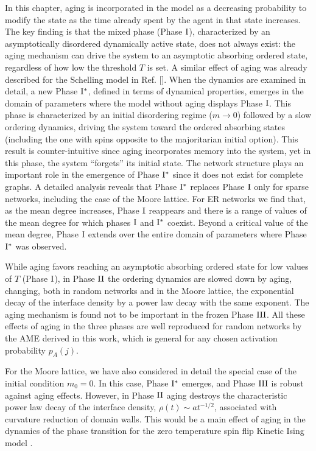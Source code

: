 In this chapter, aging is incorporated in the model as a decreasing probability to modify the state as the time already spent by the agent in that state increases. The key finding is that the mixed phase (Phase ${\rm I}$), characterized by an asymptotically disordered dynamically active state, does not always exist: the aging mechanism can drive the system to an asymptotic absorbing ordered state, regardless of how low the threshold $T$ is set. A similar effect of aging was already described for the Schelling model in Ref. []. When the dynamics are examined in detail, a new Phase ${\rm I}^{*}$, defined in terms of dynamical properties, emerges in the domain of parameters where the model without aging displays Phase ${\rm I}$. This phase is characterized by an initial disordering regime ($m \to 0$) followed by a slow ordering dynamics, driving the system toward the ordered absorbing states (including the one with spins opposite to the majoritarian initial option). This result is counter-intuitive since aging incorporates memory into the system, yet in this phase, the system ``forgets'' its initial state. The network structure plays an important role in the emergence of Phase ${\rm I}^{*}$ since it does not exist for complete graphs. A detailed analysis reveals that Phase ${\rm I}^{*}$ replaces Phase ${\rm I}$ only for sparse networks, including the case of the Moore lattice. For ER networks we find that, as the mean degree increases, Phase ${\rm I}$ reappears and there is a range of values of the mean degree for which phases ${\rm I}$ and ${\rm I}^{*}$ coexist. Beyond a critical value of the mean degree, Phase ${\rm I}$ extends over the entire domain of parameters where Phase ${\rm I}^{*}$ was observed.

While aging favors reaching an asymptotic absorbing ordered state for low values of $T$ (Phase ${\rm I}$), in Phase ${\rm II}$ the ordering dynamics are slowed down by aging, changing, both in random networks and in the Moore lattice, the exponential decay of the interface density by a power law decay with the same exponent. The aging mechanism is found not to be important in the frozen Phase ${\rm III}$. All these effects of aging in the three phases are well reproduced for random networks by the AME derived in this work, which is general for any chosen activation probability $p_A (j)$.

For the Moore lattice, we have also considered in detail the special case of the initial condition $m_0=0$. In this case, Phase ${\rm I}^{*}$ emerges, and Phase ${\rm III}$ is robust against aging effects. However, in Phase ${\rm II}$ aging destroys the characteristic power law decay of the interface density, $\rho(t) \sim at^{-1/2}$, associated with curvature reduction of domain walls. This would be a main effect of aging in the dynamics of the phase transition for the zero temperature spin flip Kinetic Ising model \cite{gunton1983}.

